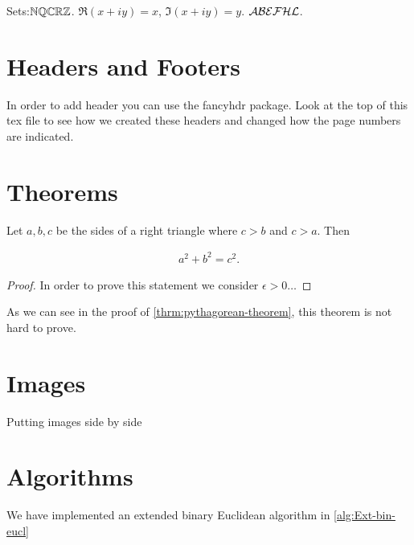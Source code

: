 Sets:$\mathbb{N}\mathbb{Q}\mathbb{C}\mathbb{R}\mathbb{Z}$. $\Re(x+iy)=x$, $\Im(x+iy)=y$. $\mathcal{A}\mathcal{B}\mathcal{E}\mathcal{F}\mathcal{H}\mathcal{L}$.

\section{Headers and Footers}
In order to add header you can use the fancyhdr package. Look at the top of this tex file to see how we created these headers and changed how the page numbers are indicated.


\section{Theorems}
\begin{theorem}\label{thrm:pythagorean-theorem}
Let $a,b,c$ be the sides of a right triangle where $c>b$ and $c>a$. Then 

\begin{align*}
    a^2+b^2=c^2.
\end{align*}
\end{theorem}

\begin{proof}
    In order to prove this statement we consider $\epsilon > 0 \dots$
\end{proof}

As we can see in the proof of \autoref{thrm:pythagorean-theorem}, this theorem is not hard to prove.

\section{Images}
Putting images side by side

\section{Algorithms}
We have implemented an extended binary Euclidean algorithm in \autoref{alg:Ext-bin-eucl}

